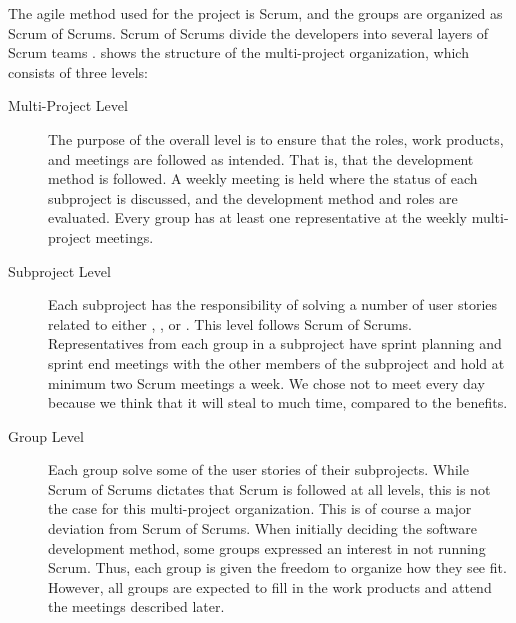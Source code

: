 The agile method used for the project is Scrum, and the groups are organized as Scrum of Scrums. Scrum of Scrums divide the developers into several layers of Scrum teams \parencite{scrum_of_scrums2015}.  shows the structure of the multi-project organization, which consists of three levels:

\begin{description}
  \item[Multi-Project Level] The purpose of the overall level is to ensure that the roles, work products, and meetings are followed as intended. That is, that the development method is followed. A weekly meeting is held where the status of each subproject is discussed, and the development method and roles are evaluated. Every group has at least one representative at the weekly multi-project meetings.
  \item[Subproject Level] Each subproject has the responsibility of solving a number of user stories related to either \gui, \db, or \bd. This level follows Scrum of Scrums. Representatives from each group in a subproject have sprint planning and sprint end meetings with the other members of the subproject and hold at minimum two Scrum meetings a week. We chose not to meet every day because we think that it will steal to much time, compared to the benefits. 
  \item[Group Level] Each group solve some of the user stories of their subprojects. While Scrum of Scrums dictates that Scrum is followed at all levels, this is not the case for this multi-project organization. This is of course a major deviation from Scrum of Scrums. When initially deciding the software development method, some groups expressed an interest in not running Scrum. Thus, each group is given the freedom to organize how they see fit. However, all groups are expected to fill in the work products and attend the meetings described later.
\end{description}

